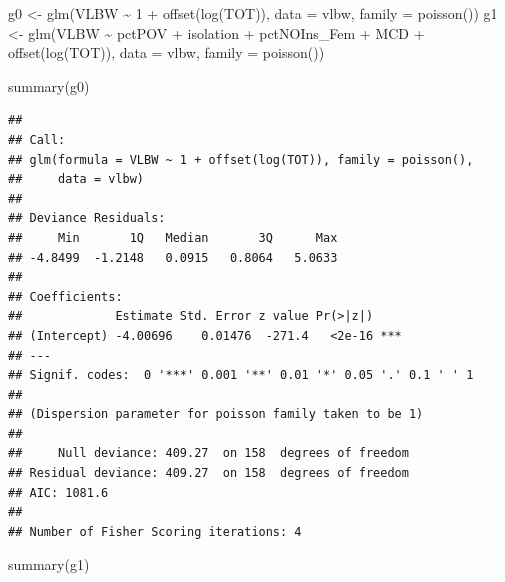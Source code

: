 \documentclass[
]{book}
\newenvironment{Shaded}{\begin{snugshade}}{\end{snugshade}}
\newcommand{\AttributeTok}[1]{\textcolor[rgb]{0.77,0.63,0.00}{#1}}
\newcommand{\DecValTok}[1]{\textcolor[rgb]{0.00,0.00,0.81}{#1}}
\newcommand{\FunctionTok}[1]{\textcolor[rgb]{0.00,0.00,0.00}{#1}}
\newcommand{\NormalTok}[1]{#1}
\newcommand{\OtherTok}[1]{\textcolor[rgb]{0.56,0.35,0.01}{#1}}
\newcommand{\SpecialCharTok}[1]{\textcolor[rgb]{0.00,0.00,0.00}{#1}}
\begin{document}
\begin{Shaded}
\begin{Highlighting}[]
\NormalTok{g0 }\OtherTok{\textless{}{-}} \FunctionTok{glm}\NormalTok{(VLBW }\SpecialCharTok{\textasciitilde{}} \DecValTok{1} \SpecialCharTok{+} \FunctionTok{offset}\NormalTok{(}\FunctionTok{log}\NormalTok{(TOT)), }
          \AttributeTok{data =}\NormalTok{ vlbw,}
          \AttributeTok{family =} \FunctionTok{poisson}\NormalTok{())}
\NormalTok{g1 }\OtherTok{\textless{}{-}} \FunctionTok{glm}\NormalTok{(VLBW }\SpecialCharTok{\textasciitilde{}}\NormalTok{ pctPOV }\SpecialCharTok{+}\NormalTok{ isolation }\SpecialCharTok{+}\NormalTok{ pctNOIns\_Fem }\SpecialCharTok{+}\NormalTok{ MCD }\SpecialCharTok{+}
            \FunctionTok{offset}\NormalTok{(}\FunctionTok{log}\NormalTok{(TOT)), }
          \AttributeTok{data =}\NormalTok{ vlbw,}
          \AttributeTok{family =} \FunctionTok{poisson}\NormalTok{())}
\end{Highlighting}
\end{Shaded}

\begin{Shaded}
\begin{Highlighting}[]
\FunctionTok{summary}\NormalTok{(g0)}
\end{Highlighting}
\end{Shaded}

\begin{verbatim}
## 
## Call:
## glm(formula = VLBW ~ 1 + offset(log(TOT)), family = poisson(), 
##     data = vlbw)
## 
## Deviance Residuals: 
##     Min       1Q   Median       3Q      Max  
## -4.8499  -1.2148   0.0915   0.8064   5.0633  
## 
## Coefficients:
##             Estimate Std. Error z value Pr(>|z|)    
## (Intercept) -4.00696    0.01476  -271.4   <2e-16 ***
## ---
## Signif. codes:  0 '***' 0.001 '**' 0.01 '*' 0.05 '.' 0.1 ' ' 1
## 
## (Dispersion parameter for poisson family taken to be 1)
## 
##     Null deviance: 409.27  on 158  degrees of freedom
## Residual deviance: 409.27  on 158  degrees of freedom
## AIC: 1081.6
## 
## Number of Fisher Scoring iterations: 4
\end{verbatim}

\begin{Shaded}
\begin{Highlighting}[]
\FunctionTok{summary}\NormalTok{(g1)}
\end{Highlighting}
\end{Shaded}
\end{document}
